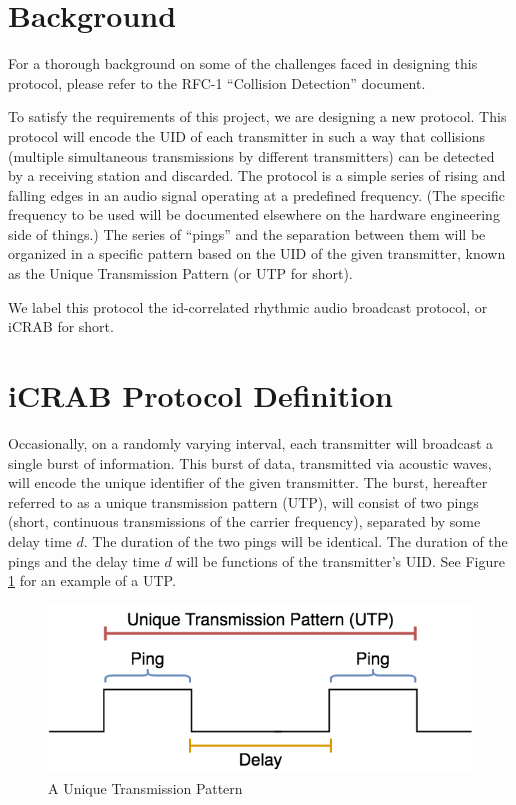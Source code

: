 \documentclass[12pt]{article}
\begin{document}
\section{Background} \label{background}

For a thorough background on some of the challenges faced in designing this
protocol, please refer to the RFC-1 ``Collision Detection'' document.

To satisfy the requirements of this project, we are designing a new protocol.
This protocol will encode the UID of each transmitter in such a way that
collisions (multiple simultaneous transmissions by different transmitters) can
be detected by a receiving station and discarded.
The protocol is a simple
series of rising and falling edges in an audio signal operating at a predefined
frequency. (The specific frequency to be used will be documented elsewhere
on the hardware engineering side of things.)
The series of ``pings'' and the separation between them will be organized in a
specific pattern based on the UID of the given transmitter, known as the
Unique Transmission Pattern (or UTP for short).

We label this protocol the id-correlated rhythmic audio broadcast protocol,
or iCRAB for short.

\section{iCRAB Protocol Definition} \label{protocol-def}

Occasionally, on a randomly varying interval, each transmitter will broadcast
a single burst of information.
This burst of data, transmitted via acoustic waves, will encode the unique
identifier of the given transmitter. The burst, hereafter referred to as a
unique transmission pattern (UTP), will consist of two pings (short, continuous
transmissions of the carrier frequency), separated by some delay time $d$.
The duration of the two pings will be identical. The duration of the pings and
the delay time $d$ will be functions of the transmitter's UID.
See Figure \ref{fig:utp} for an example of a UTP.

\begin{figure}[h]
\centering
\includegraphics[scale=0.5]{utp}

\caption{A Unique Transmission Pattern}\label{fig:utp}
\end{figure}
\end{document}
